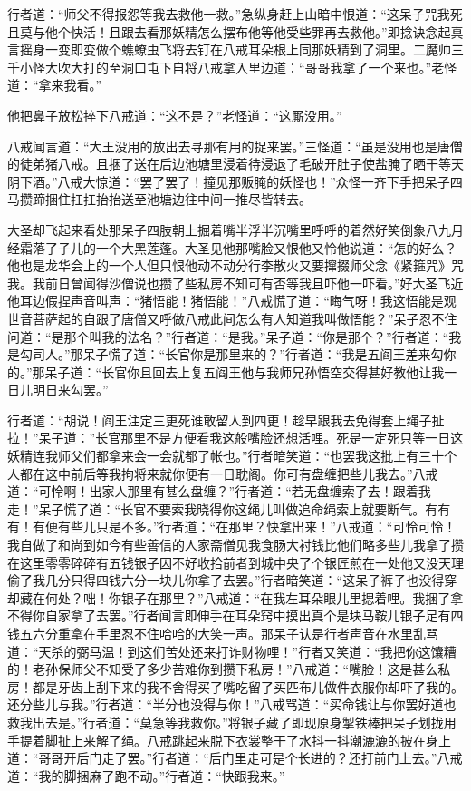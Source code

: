 \documentclass[12pt,UTF8]{ctexbook}
\begin{document}
{	行者道：“师父不得报怨等我去救他一救。”急纵身赶上山暗中恨道：“这呆子咒我死且莫与他个快活！且跟去看那妖精怎么摆布他等他受些罪再去救他。”即捻诀念起真言摇身一变即变做个蟭蟟虫飞将去钉在八戒耳朵根上同那妖精到了洞里。二魔帅三千小怪大吹大打的至洞口屯下自将八戒拿入里边道：“哥哥我拿了一个来也。”老怪道：“拿来我看。”
	
	他把鼻子放松捽下八戒道：“这不是？”老怪道：“这厮没用。”
	
	八戒闻言道：“大王没用的放出去寻那有用的捉来罢。”三怪道：“虽是没用也是唐僧的徒弟猪八戒。且捆了送在后边池塘里浸着待浸退了毛破开肚子使盐腌了晒干等天阴下酒。”八戒大惊道：“罢了罢了！撞见那贩腌的妖怪也！”众怪一齐下手把呆子四马攒蹄捆住扛扛抬抬送至池塘边往中间一推尽皆转去。
	
	大圣却飞起来看处那呆子四肢朝上掘着嘴半浮半沉嘴里呼呼的着然好笑倒象八九月经霜落了子儿的一个大黑莲蓬。大圣见他那嘴脸又恨他又怜他说道：“怎的好么？他也是龙华会上的一个人但只恨他动不动分行李散火又要撺掇师父念《紧箍咒》咒我。我前日曾闻得沙僧说也攒了些私房不知可有否等我且吓他一吓看。”好大圣飞近他耳边假捏声音叫声：“猪悟能！猪悟能！”八戒慌了道：“晦气呀！我这悟能是观世音菩萨起的自跟了唐僧又呼做八戒此间怎么有人知道我叫做悟能？”呆子忍不住问道：“是那个叫我的法名？”行者道：“是我。”呆子道：“你是那个？”行者道：“我是勾司人。”那呆子慌了道：“长官你是那里来的？”行者道：“我是五阎王差来勾你的。”那呆子道：“长官你且回去上复五阎王他与我师兄孙悟空交得甚好教他让我一日儿明日来勾罢。”
	
	行者道：“胡说！阎王注定三更死谁敢留人到四更！趁早跟我去免得套上绳子扯拉！”呆子道：”长官那里不是方便看我这般嘴脸还想活哩。死是一定死只等一日这妖精连我师父们都拿来会一会就都了帐也。”行者暗笑道：“也罢我这批上有三十个人都在这中前后等我拘将来就你便有一日耽阁。你可有盘缠把些儿我去。”八戒道：“可怜啊！出家人那里有甚么盘缠？”行者道：“若无盘缠索了去！跟着我走！”呆子慌了道：“长官不要索我晓得你这绳儿叫做追命绳索上就要断气。有有有！有便有些儿只是不多。”行者道：“在那里？快拿出来！”八戒道：“可怜可怜！我自做了和尚到如今有些善信的人家斋僧见我食肠大衬钱比他们略多些儿我拿了攒在这里零零碎碎有五钱银子因不好收拾前者到城中央了个银匠煎在一处他又没天理偷了我几分只得四钱六分一块儿你拿了去罢。”行者暗笑道：“这呆子裤子也没得穿却藏在何处？咄！你银子在那里？”八戒道：“在我左耳朵眼儿里揌着哩。我捆了拿不得你自家拿了去罢。”行者闻言即伸手在耳朵窍中摸出真个是块马鞍儿银子足有四钱五六分重拿在手里忍不住哈哈的大笑一声。那呆子认是行者声音在水里乱骂道：“天杀的弼马温！到这们苦处还来打诈财物哩！”行者又笑道：“我把你这馕糟的！老孙保师父不知受了多少苦难你到攒下私房！”八戒道：“嘴脸！这是甚么私房！都是牙齿上刮下来的我不舍得买了嘴吃留了买匹布儿做件衣服你却吓了我的。还分些儿与我。”行者道：“半分也没得与你！”八戒骂道：“买命钱让与你罢好道也救我出去是。”行者道：“莫急等我救你。”将银子藏了即现原身掣铁棒把呆子划拢用手提着脚扯上来解了绳。八戒跳起来脱下衣裳整干了水抖一抖潮漉漉的披在身上道：“哥哥开后门走了罢。”行者道：“后门里走可是个长进的？还打前门上去。”八戒道：“我的脚捆麻了跑不动。”行者道：“快跟我来。”
	
}
\end{document}
